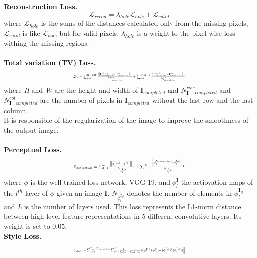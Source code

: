 \documentclass[10pt,twocolumn,letterpaper]{article}
\newcommand\norm[1]{\left\lVert#1\right\rVert}
\begin{document}
\textbf{Reconstruction Loss.} 
\begin{equation}
    \mathcal{L}_{recon} = \lambda_{hole} \mathcal{L}_{hole} + \mathcal{L}_{valid}
\end{equation}
where \(\mathcal{L}_{hole}\) is the sums of the distances calculated only from the missing pixels, \(\mathcal{L}_{valid}\) is like \(\mathcal{L}_{hole}\) but for valid pixels. \(\lambda_{hole}\) is a weight to the pixel-wise loss withing the missing regions.
\\
\\
\textbf{Total variation (TV) Loss.} 
\begin{equation}
\resizebox{.47 \textwidth}{!}{%
    $\mathcal{L}_{tv} = \sum^{H-1,W}_{x,y} \frac{\norm{ \mathbf{I}^{x+1,y}_{completed} - \mathbf{I}^{x,y}_{completed} }_1}{N^{row}_{\mathbf{I}_{completed}}} + \sum^{H,W-1}_{x,y} \frac{\norm{ \mathbf{I}^{x,y+1}_{completed} - \mathbf{I}^{x,y}_{completed} }_1}{N^{col}_{\mathbf{I}_{completed}}}$%
    }
\end{equation}
where \textit{H} and \textit{W} are the height and width of \(\mathbf{I}_{completed}\) and \(N^{row}_\mathbf{I}_{completed}\) and \(N^{col}_\mathbf{I}_{completed}\) are the number of pixels in \(\mathbf{I}_{completed}\) without the last row and the last column.
\\
It is responsible of the regularization of the image to improve the smoothness of the output image.
\\
\\
\textbf{Perceptual Loss.} 
\begin{equation}
\resizebox{.47 \textwidth}{!}{%
    $\mathcal{L}_{perceptual} = \sum^L_{l=1} \frac{\norm{ \phi^{\mathbf{I}_{out}}_l - \phi^{\mathbf{I}_{gt}}_l }_1}{N_{\phi^{\mathbf{I}_{gt}}_l}} + \sum^L_{l=1} \frac{\norm{ \phi^{\mathbf{I}_{completed}}_l - \phi^{\mathbf{I}_{gt}}_l }_1}{N_{\phi^{\mathbf{I}_{gt}}_l}}$%
    }
\end{equation}
where \(\phi\) is the well-trained loss network, VGG-19\cite{simonyan2014very}, and \(\phi^{\mathbf{I}}_l\) the actiovation maps of the \(l^{th}\) layer of \(\phi\) given an image \(\mathbf{I}\).
\(N_{\phi^{\mathbf{I}_{gt}}_l}\) denotes the number of elements in \(\phi^{\mathbf{I}_{gt}}_l\) and \textit{L} is the number of layers used.
This loss represents the L1-norm distance between high-level feature representations in 5 different convolutive layers. Its weight is set to \(0.05\).
\\
\textbf{Style Loss.}
\begin{equation}
    \resizebox{.47 \textwidth}{!}{%
        $\mathcal{L}_{style} = \sum^{\mathbf{I}_{out},\mathbf{I}_{completed}}_{l=1} \sum^L_{l=1} \frac{1}{C_l C_l} \norm{ \frac{1}{C_l H_l W_l} ((\phi^{\mathbf{I}}_l)^\top(\phi^{\mathbf{I}}_l) - (\phi^{\mathbf{I}_{gt}}_l)^\top(\phi^{\mathbf{I}_{gt}}_l)  )}$%
}   
\end{equation}
\end{document}
